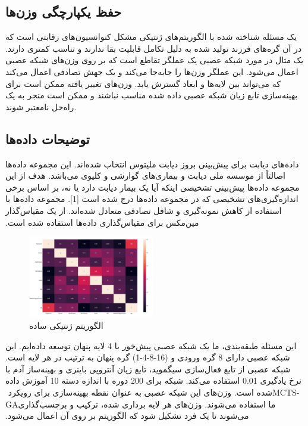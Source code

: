 \documentclass[11pt]{article}
\begin{document}
\begin{multicols}{2}
		\subsection{حفظ یکپارچگی وزن‌ها}
		یک مسئله شناخته شده با الگوریتم‌های ژنتیکی مشکل کنوانسیون‌های رقابتی است که در آن گره‌های فرزند تولید شده به دلیل تکامل قابلیت بقا ندارند و تناسب کمتری دارند. یک مثال در مورد شبکه عصبی یک عملگر تقاطع است که بر روی وزن‌های شبکه عصبی اعمال می‌شود. این عملگر وزن‌ها را جابه‌جا می‌کند و یک جهش تصادفی اعمال می‌کند که می‌تواند بین لایه‌ها و ابعاد گسترش یابد. وزن‌های تغییر یافته ممکن است برای بهینه‌سازی تابع زیان شبکه عصبی داده شده مناسب نباشند و ممکن است منجر به یک راه‌حل نامعتبر شوند.
		
		\subsection{توضیحات داده‌ها}
		داده‌های دیابت برای پیش‌بینی بروز دیابت ملیتوس انتخاب شده‌اند. این ‏مجموعه داده‌ها اصالتاً از موسسه ملی دیابت و بیماری‌های گوارشی و ‏کلیوی می‌باشد. هدف از این مجموعه داده‌ها پیش‌بینی تشخیصی اینکه ‏آیا یک بیمار دیابت دارد یا نه، بر اساس برخی اندازه‌گیری‌های تشخیصی ‏که در مجموعه داده‌ها درج شده است [1]. مجموعه داده‌ها با استفاده از ‏کاهش نمونه‌گیری و شافل تصادفی متعادل شده‌اند. از یک مقیاس‌گذار ‏مین‌مکس برای مقیاس‌گذاری داده‌ها استفاده شده است.‏
		
		\begin{figure}[H]
			\centering
			\includegraphics[width=0.49\textwidth,keepaspectratio]{4.png}
			\caption{الگوریتم ژنتیکی ساده}
			\label{fig:fig4}
		\end{figure}
		
		
		این مسئله طبقه‌بندی، ما یک شبکه عصبی پیش‌خور با 4 لایه پنهان ‏توسعه داده‌ایم. این شبکه عصبی دارای 8 گره ورودی و (16-8-4-1) ‏گره پنهان به ترتیب در هر لایه است. شبکه عصبی از تابع فعال‌سازی ‏سیگموید، تابع زیان آنتروپی باینری و بهینه‌ساز آدم با نرخ یادگیری 0.01 ‏استفاده می‌کند. شبکه برای 200 دوره با اندازه دسته 10 آموزش داده شده ‏است.‏
		وزن‌های این شبکه عصبی به عنوان نقطه بهینه‌سازی برای رویکرد ‏MCTS-‎GA‏ ما استفاده می‌شوند. وزن‌های هر لایه برداری شده، ترکیب و ‏برچسب‌گذاری می‌شوند تا یک فرد تشکیل شود که الگوریتم بر روی آن ‏اعمال می‌شود.‏

\end{multicols}
\end{document}
